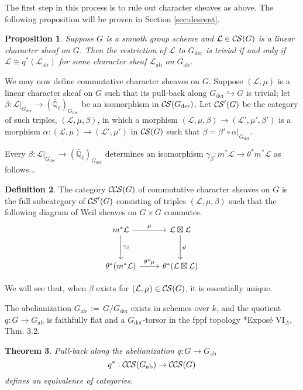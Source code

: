 \documentclass[10pt]{amsart}
\theoremstyle{plain}
\newtheorem{theorem}{Theorem}[section]
\newtheorem{proposition}[theorem]{Proposition}
\theoremstyle{definition}
\newtheorem{definition}[theorem]{Definition}
\newcommand{\EE}{\mathbb{\bar Q}_\ell}
\newcommand{\Fq}{k}
\newcommand{\der}{_{\operatorname{der}}}
\newcommand{\ab}{_{\operatorname{ab}}}
\newcommand{\ceq}{{\, :=\, }}
\newcommand{\cs}[1]{{\mathcal{#1}}}
\newcommand{\CS}{{\mathcal{C\hskip-0.8pt S}}}
\newcommand{\CCS}{{\mathcal{C\hskip-.8pt C\hskip-0.8pt S}}}
\begin{document}
The first step in this process is to rule out character sheaves as above.
The following proposition will be proven in Section \ref{sec:descent}.
\begin{proposition} \label{prop:Gder_triv}
Suppose $G$ is a smooth group scheme and $\cs{L} \in \CS(G)$ is a linear character sheaf on $G$.
Then the restriction of $\cs{L}$ to $G\der$ is trivial if and only if $\cs{L} \cong q^*(\cs{L}\ab)$ for some
character sheaf $\cs{L}\ab$ on $G\ab$.
\end{proposition}

We may now define commutative character sheaves on $G$.
%
Suppose $(\cs{L},\mu)$ is a linear character sheaf on $G$ such that its pull-back along $G\der \hookrightarrow G$ is trivial;
let $\beta : \cs{L}\vert_{G\der} \to (\EE)_{G\der}$ be an isomorphism in $\CS(G\der)$.
Let $\CS'(G)$ be the category of such triples, $(\cs{L},\mu,\beta)$, in which a morphism $(\cs{L},\mu,\beta)\to (\cs{L}',\mu',\beta')$ is a morphism $\alpha : (\cs{L},\mu)\to (\cs{L}',\mu')$ in $\CS(G)$ such that $\beta = \beta' \circ \alpha\vert_{G\der}$.
%

Every $\beta : \cs{L}\vert_{G\der} \to (\EE)_{G\der}$ determines an isomorphism $\gamma_\beta : m^*\cs{L} \to \theta^*m^*\cs{L}$ as follows...

\begin{definition}\label{def:CCS}
The category $\CCS(G)$ of commutative character sheaves on $G$ is the full subcategory of $\CS'(G)$ consisting of triples $(\cs{L},\mu,\beta)$ such that the following diagram of Weil sheaves on $G \times G$ commutes.
  \[
  \begin{tikzcd}[row sep=30]
   m^*\cs{L} \arrow{d}{\gamma_\beta} \arrow{r}{\mu} & \cs{L}\boxtimes\cs{L} \arrow{d}{\vartheta}\\
   \theta^*(m^*\cs{L}) \arrow{r}{{\theta}^*\mu} &  \theta^*(\cs{L}\boxtimes\cs{L})
  \end{tikzcd}
  \]
\end{definition}

We will see that, when $\beta$ exists for $(\cs{L},\mu)\in \CS(G)$, it is essentially unique.

The abelianization $G\ab\ceq G/G\der$ exists in schemes over $\Fq$, and the quotient $q : G \to G\ab$ is faithfully flat and a $G\der$-torsor in the fppf topology \cite{SGA3}*{Expos\'e {VI}$_A$, Thm. 3.2}.

\begin{theorem}\label{thm:Gab}
Pull-back along the abelianization $q : G \to G\ab$
\[
q^* : \CCS(G\ab) \to \CCS(G)
\]
defines an equivalence of categories.
\end{theorem}
\end{document}
